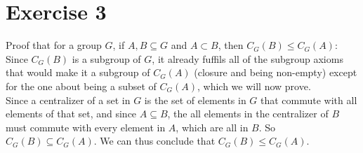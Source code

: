 \documentclass{article}
\begin{document}
    \section*{Exercise 3}
    Proof that for a group $G$, if $A, B \subseteq G$ and $A \subset B$,
    then $C_G(B) \leqslant C_G(A)$: \\
    Since $C_G(B)$ is a subgroup of $G$,
    it already fuffils all of the subgroup axioms that would make
    it a subgroup of $C_G(A)$ (closure and being non-empty)
    except for the one about being a subset of $C_G(A)$,
    which we will now prove. \\
    Since a centralizer of a set in $G$ is the set of elements in $G$
    that commute with all elements of that set,
    and since $A \subseteq B$,
    the all elements in the centralizer of $B$ must commute with every
    element in $A$, which are all in $B$.
    So $C_G(B) \subseteq C_G(A)$.
    We can thus conclude that $C_G(B) \leqslant C_G(A)$.
\end{document}
